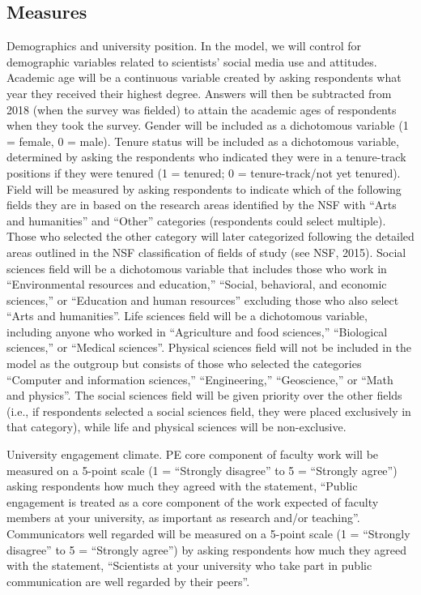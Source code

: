 \documentclass[12pt,]{article}
\begin{document}
\hypertarget{measures}{%
\subsection{Measures}\label{measures}}

Demographics and university position. In the model, we will control for demographic variables related to scientists' social media use and attitudes. Academic age will be a continuous variable created by asking respondents what year they received their highest degree. Answers will then be subtracted from 2018 (when the survey was fielded) to attain the academic ages of respondents when they took the survey. Gender will be included as a dichotomous variable (1 = female, 0 = male). Tenure status will be included as a dichotomous variable, determined by asking the respondents who indicated they were in a tenure-track positions if they were tenured (1 = tenured; 0 = tenure-track/not yet tenured). Field will be measured by asking respondents to indicate which of the following fields they are in based on the research areas identified by the NSF with ``Arts and humanities'' and ``Other'' categories (respondents could select multiple). Those who selected the other category will later categorized following the detailed areas outlined in the NSF classification of fields of study (see NSF, 2015). Social sciences field will be a dichotomous variable that includes those who work in ``Environmental resources and education,'' ``Social, behavioral, and economic sciences,'' or ``Education and human resources'' excluding those who also select ``Arts and humanities''. Life sciences field will be a dichotomous variable, including anyone who worked in ``Agriculture and food sciences,'' ``Biological sciences,'' or ``Medical sciences''. Physical sciences field will not be included in the model as the outgroup but consists of those who selected the categories ``Computer and information sciences,'' ``Engineering,'' ``Geoscience,'' or ``Math and physics''. The social sciences field will be given priority over the other fields (i.e., if respondents selected a social sciences field, they were placed exclusively in that category), while life and physical sciences will be non-exclusive.

University engagement climate. PE core component of faculty work will be measured on a 5-point scale (1 = ``Strongly disagree'' to 5 = ``Strongly agree'') asking respondents how much they agreed with the statement, ``Public engagement is treated as a core component of the work expected of faculty members at your university, as important as research and/or teaching''. Communicators well regarded will be measured on a 5-point scale (1 = ``Strongly disagree'' to 5 = ``Strongly agree'') by asking respondents how much they agreed with the statement, ``Scientists at your university who take part in public communication are well regarded by their peers''.
\end{document}
